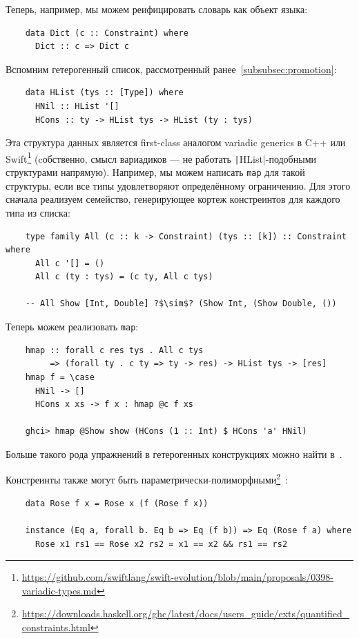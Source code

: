 Теперь, например, мы можем реифицировать словарь как объект языка:
\begin{verbatim}
    data Dict (c :: Constraint) where
      Dict :: c => Dict c
\end{verbatim}

Вспомним гетерогенный список, рассмотренный ранее~\ref{subsubsec:promotion}:
\begin{verbatim}
    data HList (tys :: [Type]) where
      HNil :: HList '[]
      HCons :: ty -> HList tys -> HList (ty : tys)
\end{verbatim}

Эта структура данных является first-class аналогом variadic generics в C++ или Swift\footnote{\url{https://github.com/swiftlang/swift-evolution/blob/main/proposals/0398-variadic-types.md}} (cобственно, смысл вариадиков --- не работать \texttt|HList|-подобными структурами напрямую).
Например, мы можем написать \texttt{map} для такой структуры, если все типы удовлетворяют определённому ограничению.
Для этого сначала реализуем семейство, генерирующее кортеж констреинтов для каждого типа из списка:
\begin{verbatim}
    type family All (c :: k -> Constraint) (tys :: [k]) :: Constraint where
      All c '[] = ()
      All c (ty : tys) = (c ty, All c tys)

    -- All Show [Int, Double] ?$\sim$? (Show Int, (Show Double, ())
\end{verbatim}

Теперь можем реализовать \texttt{map}:
\begin{verbatim}
    hmap :: forall c res tys . All c tys
         => (forall ty . c ty => ty -> res) -> HList tys -> [res]
    hmap f = \case
      HNil -> []
      HCons x xs -> f x : hmap @c f xs

    ghci> hmap @Show show (HCons (1 :: Int) $ HCons 'a' HNil)
\end{verbatim}

Больше такого рода упражнений в гетерогенных конструкциях можно найти в~\cite{de2014true}.

Констреинты также могут быть параметрически-полиморфными\footnote{\url{https://downloads.haskell.org/ghc/latest/docs/users_guide/exts/quantified_constraints.html}}~\cite{bottu2017quantified}:
\begin{verbatim}
    data Rose f x = Rose x (f (Rose f x))

    instance (Eq a, forall b. Eq b => Eq (f b)) => Eq (Rose f a) where
      Rose x1 rs1 == Rose x2 rs2 = x1 == x2 && rs1 == rs2
\end{verbatim}

